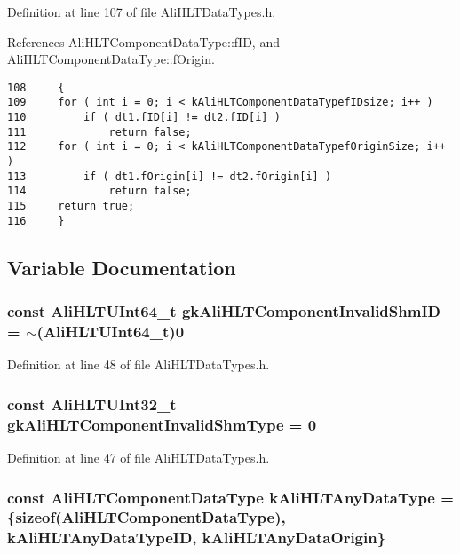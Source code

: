 Definition at line 107 of file Ali\-HLTData\-Types.h.

References Ali\-HLTComponent\-Data\-Type::f\-ID, and Ali\-HLTComponent\-Data\-Type::f\-Origin.

\footnotesize\begin{verbatim}108     {
109     for ( int i = 0; i < kAliHLTComponentDataTypefIDsize; i++ )
110         if ( dt1.fID[i] != dt2.fID[i] )
111             return false;
112     for ( int i = 0; i < kAliHLTComponentDataTypefOriginSize; i++ )
113         if ( dt1.fOrigin[i] != dt2.fOrigin[i] )
114             return false;
115     return true;
116     }
\end{verbatim}\normalsize 




\subsection{Variable Documentation}
\subsubsection{\setlength{\rightskip}{0pt plus 5cm}const {\bf Ali\-HLTUInt64\_\-t} {\bf gk\-Ali\-HLTComponent\-Invalid\-Shm\-ID} = $\sim$({\bf Ali\-HLTUInt64\_\-t})0}\label{AliHLTDataTypes_8h_a11}




Definition at line 48 of file Ali\-HLTData\-Types.h.
\subsubsection{\setlength{\rightskip}{0pt plus 5cm}const {\bf Ali\-HLTUInt32\_\-t} {\bf gk\-Ali\-HLTComponent\-Invalid\-Shm\-Type} = 0}\label{AliHLTDataTypes_8h_a10}




Definition at line 47 of file Ali\-HLTData\-Types.h.
\subsubsection{\setlength{\rightskip}{0pt plus 5cm}const {\bf Ali\-HLTComponent\-Data\-Type} {\bf k\-Ali\-HLTAny\-Data\-Type} = \{sizeof({\bf Ali\-HLTComponent\-Data\-Type}), k\-Ali\-HLTAny\-Data\-Type\-ID, k\-Ali\-HLTAny\-Data\-Origin\}}\label{AliHLTDataTypes_8h_a15}




